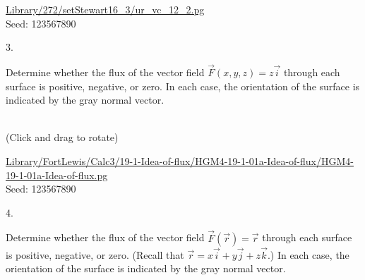 \documentclass[10pt,]{book}
\theoremstyle{plain}
\theoremstyle{definition}
\theoremstyle{definition}
\theoremstyle{definition}
\theoremstyle{definition}
\theoremstyle{definition}
\numberwithin{equation}{section}
\begin{document}
\begin{exerciselist}
\begin{mdframed}
{}\par\vspace*{2ex}%
{\tiny\ttfamily\noindent\url{Library/272/setStewart16_3/ur_vc_12_2.pg}\\Seed: 123567890\hfill}\end{mdframed}
\item[3.]\hypertarget{exercise-76}{}\mbox{}\\ %
\begin{mdframed}
{
Determine whether the flux of the vector field 
\(\vec{F}(x,y,z) = z \vec{i}\) through each surface is positive,
negative, or zero.  In each case, the orientation
of the surface is indicated by the gray normal 
vector.  
\par 
\begin{center}
\par\medskip\centerline{\kern 0pt\vbox{}\kern 0pt}\medskip

\leavevmode\\\relax 
(Click and drag to rotate)
\end{center}


}\par\vspace*{2ex}%
{\tiny\ttfamily\noindent\url{Library/FortLewis/Calc3/19-1-Idea-of-flux/HGM4-19-1-01a-Idea-of-flux/HGM4-19-1-01a-Idea-of-flux.pg}\\Seed: 123567890\hfill}\end{mdframed}
\item[4.]\hypertarget{exercise-77}{}\mbox{}\\ %
\begin{mdframed}
{
Determine whether the flux of the vector field 
\(\vec{F}(\vec{r}) = \vec{r}\) 
through each surface is positive,
negative, or zero.  
(Recall that \(\vec{r} = x\vec{i} + y\vec{j} + z\vec{k}\).)  
In each case, the orientation
of the surface is indicated by the gray normal 
vector.
\par 
\begin{center}
\par\medskip\centerline{\kern 0pt\vbox{}\kern 0pt}\medskip


\end{center}}
\end{mdframed}
\end{exerciselist}
\end{document}
